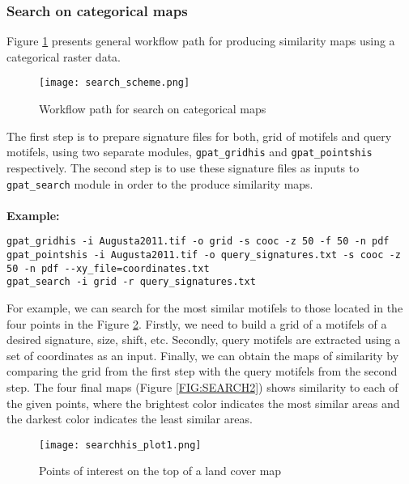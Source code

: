 \subsubsection{Search on categorical maps}
Figure \ref{FIG:SEARCH} presents general workflow path for producing similarity maps using a categorical raster data. 

\begin{figure}[H]
	\centering
	\texttt{[image: search\_scheme.png]}
	\caption{Workflow path for search on categorical maps}
	\label{FIG:SEARCH}
\end{figure}

The first step is to prepare signature files for both, grid of motifels and query motifels, using two separate modules, {\tt gpat\_gridhis} and {\tt gpat\_pointshis} respectively. 
The second step is to use these signature files as inputs to {\tt gpat\_search} module in order to the produce similarity maps.\\\\

{\bf Example:}

\begin{minipage}{\linewidth}
\begin{lstlisting}
gpat_gridhis -i Augusta2011.tif -o grid -s cooc -z 50 -f 50 -n pdf
gpat_pointshis -i Augusta2011.tif -o query_signatures.txt -s cooc -z 50 -n pdf --xy_file=coordinates.txt
gpat_search -i grid -r query_signatures.txt
\end{lstlisting}
\end{minipage}

For example, we can search for the most similar motifels to those located in the four points in the Figure \ref{FIG:SEARCH1}. 
Firstly, we need to build a grid of a motifels of a desired signature, size, shift, etc. 
Secondly, query motifels are extracted using a set of coordinates as an input. 
Finally, we can obtain the maps of similarity by comparing the grid from the first step with the query motifels from the second step.
The four final maps (Figure \ref{FIG:SEARCH2}) shows similarity to each of the given points, where the brightest color indicates the most similar areas and the darkest color indicates the least similar areas.

\begin{figure}[H]
	\centering
	\texttt{[image: searchhis\_plot1.png]}
	\caption{Points of interest on the top of a land cover map}
	\label{FIG:SEARCH1}
\end{figure}

